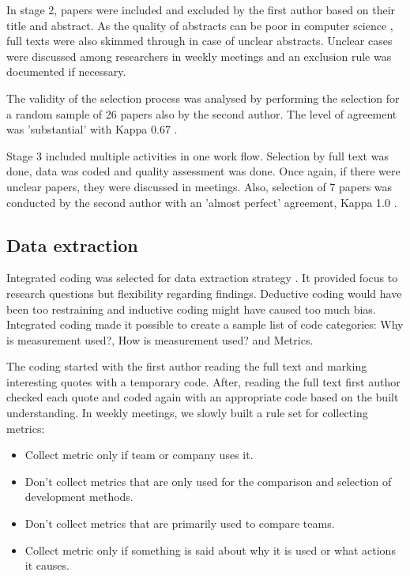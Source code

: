 \documentclass{sig-alternate}
\begin{document}
In stage 2, papers were included and excluded by the first author based on
their title and abstract. As the quality of abstracts can be poor in computer
science \cite{kitchenham2004procedures}, full texts were also skimmed through
in case of unclear abstracts.
Unclear cases were discussed among researchers in weekly meetings and an
exclusion rule was documented if necessary.

The validity of the selection process was analysed by performing the selection
for a random sample of 26 papers also by the second author. The level of
agreement was 'substantial' with Kappa 0.67 \cite{landis_measurement_1977}.


Stage 3 included multiple activities in one work flow. Selection by full text
was done, data was coded and quality assessment was done. Once again, if there
were unclear papers, they were discussed in meetings. Also, selection of 7
papers was conducted by the second author with an 'almost perfect' agreement,
Kappa 1.0 \cite{landis_measurement_1977}.

\subsection{Data extraction}

Integrated coding was selected for data extraction strategy \cite{6092576}. It
provided focus to research questions but flexibility regarding findings.
Deductive coding would have been too restraining and inductive coding might
have caused too much bias. Integrated coding made it possible to create a
sample list of code categories: Why is measurement used?, How is measurement
used? and Metrics.

The coding started with the first author reading the full text and marking
interesting quotes with a temporary code. After, reading the full text first
author checked each quote and coded again with an appropriate code based on
the built understanding. In weekly meetings, we slowly built a rule set
for collecting metrics:

\begin{itemize}
  \item Collect metric only if team or company uses it.
  \item Don't collect metrics that are only used for the comparison and
  selection of development methods. 
  \item Don't collect metrics that are primarily used to compare teams.
  \item Collect metric only if something is said about why it is used or what
  actions it causes. 
\end{itemize}
\end{document}
